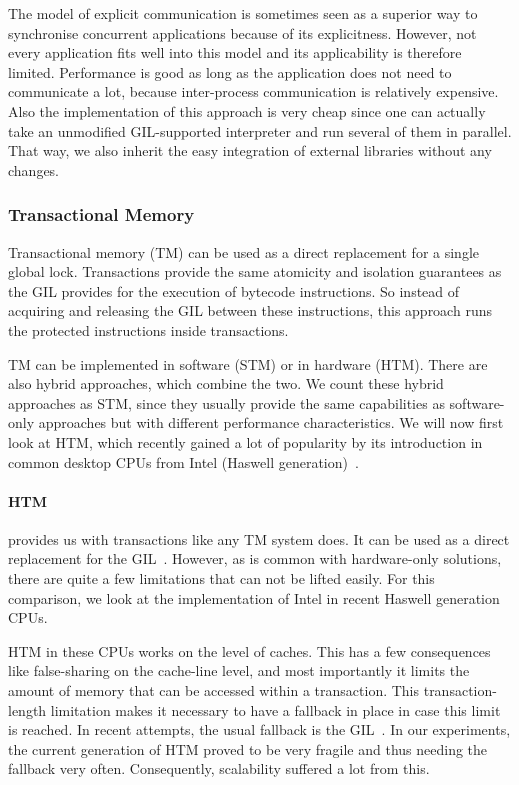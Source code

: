 \documentclass{sigplanconf}
\begin{document}
The model of explicit communication is sometimes seen as a superior
way to synchronise concurrent applications because of its explicitness.
However, not every application fits well into this model and its
applicability is therefore limited. Performance is good as
long as the application does not need to communicate a lot, because
inter-process communication is relatively expensive. Also the
implementation of this approach is very cheap since one can
actually take an unmodified GIL-supported interpreter and run
several of them in parallel. That way, we also inherit the
easy integration of external libraries without any changes.


\subsubsection{Transactional Memory}
Transactional memory (TM) can be used as a direct replacement for a
single global lock. Transactions provide the same atomicity and
isolation guarantees as the GIL provides for the execution of bytecode
instructions. So instead of acquiring and releasing the GIL between
these instructions, this approach runs the protected instructions
inside transactions.

TM can be implemented in software (STM) or in hardware (HTM). There
are also hybrid approaches, which combine the two. We count these
hybrid approaches as STM, since they usually provide the same
capabilities as software-only approaches but with different
performance characteristics. We will now first look at HTM, which
recently gained a lot of popularity by its introduction in common
desktop CPUs from Intel (Haswell generation)~\cite{odaira14,leis14}.

\paragraph{HTM} provides us with transactions like any TM system does.
It can be used as a direct replacement for the GIL~\cite{nicholas06,odaira14,fuad10}. However, as is
common with hardware-only solutions, there are quite a few limitations
that can not be lifted easily. For this comparison, we look at the
implementation of Intel in recent Haswell generation CPUs.

HTM in these CPUs works on the level of caches. This has a few
consequences like false-sharing on the cache-line level, and most
importantly it limits the amount of memory that can be accessed within
a transaction. This transaction-length limitation makes it necessary
to have a fallback in place in case this limit is reached. In recent
attempts, the usual fallback is the GIL~\cite{odaira14,fuad10}. In our
experiments, the current generation of HTM proved to be very fragile
and thus needing the fallback very often. Consequently, scalability
suffered a lot from this.
\end{document}
